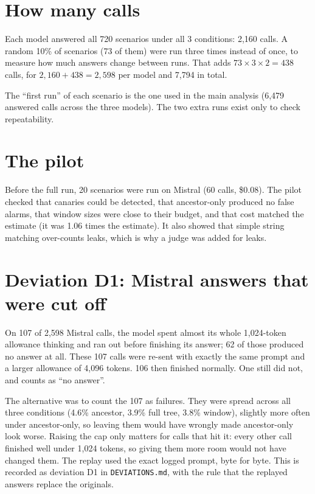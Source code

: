 \section{How many calls}

Each model answered all 720 scenarios under all 3 conditions: 2,160 calls. A random 10\% of scenarios (73 of them) were run three times instead of once, to measure how much answers change between runs. That adds $73 \times 3 \times 2 = 438$ calls, for $2{,}160 + 438 = 2{,}598$ per model and 7,794 in total.

\begin{plain}
The ``first run'' of each scenario is the one used in the main analysis (6,479 answered calls across the three models). The two extra runs exist only to check repeatability.
\end{plain}

\section{The pilot}

Before the full run, 20 scenarios were run on Mistral (60 calls, \$0.08). The pilot checked that canaries could be detected, that ancestor-only produced no false alarms, that window sizes were close to their budget, and that cost matched the estimate (it was 1.06 times the estimate). It also showed that simple string matching over-counts leaks, which is why a judge was added for leaks.

\section{Deviation D1: Mistral answers that were cut off}

\begin{plain}
On 107 of 2,598 Mistral calls, the model spent almost its whole 1,024-token allowance thinking and ran out before finishing its answer; 62 of those produced no answer at all. These 107 calls were re-sent with exactly the same prompt and a larger allowance of 4,096 tokens. 106 then finished normally. One still did not, and counts as ``no answer''.
\end{plain}

\begin{why}
The alternative was to count the 107 as failures. They were spread across all three conditions (4.6\% ancestor, 3.9\% full tree, 3.8\% window), slightly more often under ancestor-only, so leaving them would have wrongly made ancestor-only look worse. Raising the cap only matters for calls that hit it: every other call finished well under 1,024 tokens, so giving them more room would not have changed them. The replay used the exact logged prompt, byte for byte. This is recorded as deviation D1 in \texttt{DEVIATIONS.md}, with the rule that the replayed answers replace the originals.
\end{why}

